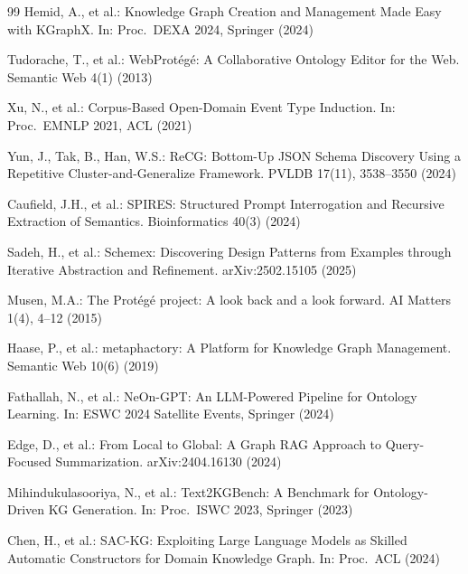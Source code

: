 \documentclass[runningheads,a4paper]{llncs}
\begin{document}
\begin{thebibliography}{99}
Hemid, A., et al.:
Knowledge Graph Creation and Management Made Easy with KGraphX.
In: Proc.\ DEXA 2024, Springer (2024)

Tudorache, T., et al.:
WebProt\'eg\'e: A Collaborative Ontology Editor for the Web.
Semantic Web 4(1) (2013)

Xu, N., et al.:
Corpus-Based Open-Domain Event Type Induction.
In: Proc.\ EMNLP 2021, ACL (2021)

Yun, J., Tak, B., Han, W.S.: ReCG: Bottom-Up JSON Schema Discovery
Using a Repetitive Cluster-and-Generalize Framework. PVLDB 17(11),
3538--3550 (2024)

Caufield, J.H., et al.: SPIRES: Structured Prompt Interrogation and
Recursive Extraction of Semantics. Bioinformatics 40(3) (2024)

Sadeh, H., et al.:
Schemex: Discovering Design Patterns from Examples through Iterative
Abstraction and Refinement.
arXiv:2502.15105 (2025)

Musen, M.A.:
The Prot\'eg\'e project: A look back and a look forward.
AI Matters 1(4), 4--12 (2015)

Haase, P., et al.:
metaphactory: A Platform for Knowledge Graph Management.
Semantic Web 10(6) (2019)

Fathallah, N., et al.: NeOn-GPT: An LLM-Powered Pipeline for
Ontology Learning. In: ESWC 2024 Satellite Events, Springer (2024)

Edge, D., et al.: From Local to Global: A Graph RAG Approach to
Query-Focused Summarization. arXiv:2404.16130 (2024)

Mihindukulasooriya, N., et al.: Text2KGBench: A Benchmark for
Ontology-Driven KG Generation. In: Proc.\ ISWC 2023, Springer (2023)

Chen, H., et al.: SAC-KG: Exploiting Large Language Models as Skilled
Automatic Constructors for Domain Knowledge Graph. In: Proc.\ ACL
(2024)

\end{thebibliography}
\end{document}
